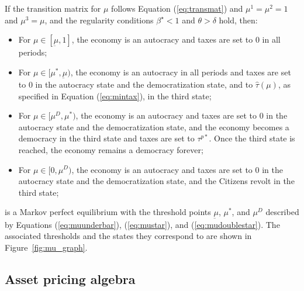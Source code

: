 \begin{prop}
If the transition matrix for $\mu$ follows Equation (\ref{eq:transmat}) and $\mu^{1}=\mu^{2}=1$ and $\mu^{3}=\mu$, and the regularity conditions $\beta^{\star}<1$ and $\theta>\delta$ hold, then: 
\begin{itemize}
	\item For $\mu \in [\underbar{\ensuremath{\mu}},1]$, the economy is an autocracy and taxes are set to 0 in all periods;
	\item For $\mu \in [\mu^{*},\underbar{\ensuremath{\mu}})$, the economy is an autocracy in all periods and taxes are set to 0 in the autocracy state and the democratization state, and to $\hat{\tau}(\mu)$, as specified in Equation (\ref{eq:mintax}), in the third state;
	\item For $\mu \in [\mu^{D},\mu^{*})$, the economy is an autocracy and taxes are set to 0 in the autocracy state and the democratization state, and the economy becomes a democracy in the third state and taxes are set to $\tau^{p*}$. Once the third state is reached, the economy remains a democracy forever;
	\item For $\mu \in [0,\mu^{D})$, the economy is an autocracy and taxes are set to 0 in the autocracy state and the democratization state, and the Citizens revolt in the third state;
\end{itemize}
is a Markov perfect equilibrium with the threshold points $\underbar{\ensuremath{\mu}}$, $\mu^{*}$, and $\mu^{D}$ described by Equations (\ref{eq:muunderbar}), (\ref{eq:mustar}), and (\ref{eq:mudoublestar}). The associated thresholds and the states they correspond to are shown in Figure~\ref{fig:mu_graph}.
\end{prop}



\subsection{Asset pricing algebra}\label{section:ap4state}

